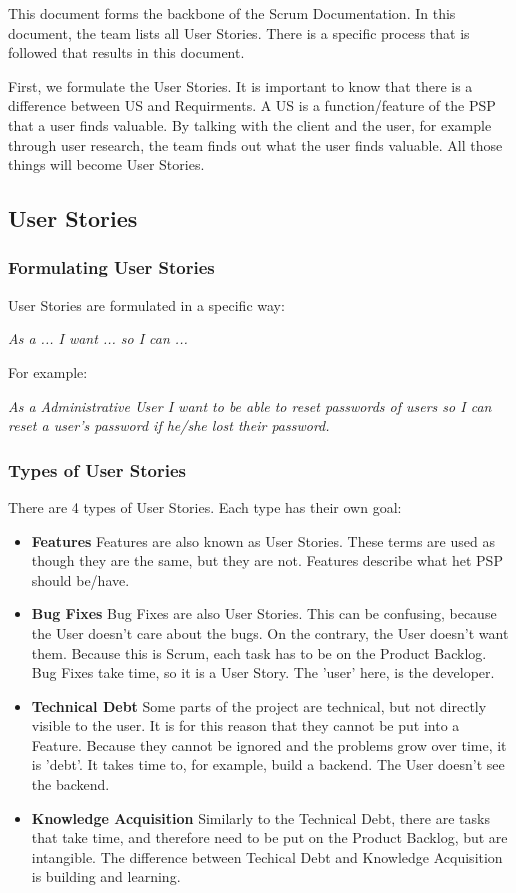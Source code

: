 \documentclass[10pt]{report}
\begin{document}
This document forms the backbone of the Scrum Documentation. In this document, the team lists all User Stories. There is a specific process that is followed that results in this document.

First, we formulate the User Stories. It is important to know that there is a difference between US and Requirments. A US is a function/feature of the PSP that a user finds valuable. By talking with the client and the user, for example through user research, the team finds out what the user finds valuable. All those things will become User Stories.

\subsection{User Stories}

\subsubsection{Formulating User Stories}

User Stories are formulated in a specific way:

\emph{As a ... I want ... so I can ...}

\noindent For example:

\emph{As a Administrative User I want to be able to reset passwords of users so I can reset a user's password if he/she lost their password.}

\subsubsection{Types of User Stories}

There are 4 types of User Stories. Each type has their own goal:

\begin{itemize}
	\item \textbf{Features} Features are also known as User Stories. These terms are used as though they are the same, but they are not. Features describe what het PSP should be/have.
	\item \textbf{Bug Fixes} Bug Fixes are also User Stories. This can be confusing, because the User doesn't care about the bugs. On the contrary, the User doesn't want them. Because this is Scrum, each task has to be on the Product Backlog. Bug Fixes take time, so it is a User Story. The 'user' here, is the developer.
	\item \textbf{Technical Debt} Some parts of the project are technical, but not directly visible to the user. It is for this reason that they cannot be put into a Feature. Because they cannot be ignored and the problems grow over time, it is 'debt'. It takes time to, for example, build a backend. The User doesn't see the backend.
	\item \textbf{Knowledge Acquisition} Similarly to the Technical Debt, there are tasks that take time, and therefore need to be put on the Product Backlog, but are intangible. The difference between Techical Debt and Knowledge Acquisition is building and learning.
\end{itemize}
\end{document}
